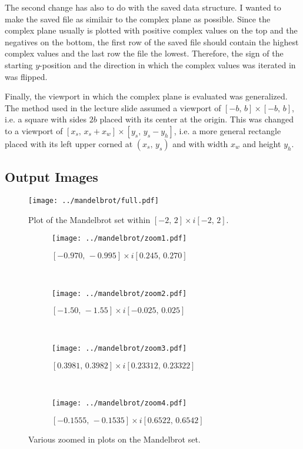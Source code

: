 \documentclass{article}
\begin{document}
The second change has also to do with the saved data structure.
I wanted to make the saved file as similair to the complex plane as possible.
Since the complex plane usually is plotted with positive complex values on the top
and the negatives on the bottom,
the first row of the saved file should contain the highest complex values
and the last row the file the lowest.
Therefore, the sign of the starting $y$-position
and the direction in which the complex values was iterated in was flipped.

Finally, the viewport in which the complex plane is evaluated was generalized.
The method used in the lecture slide assumed a viewport of $[-b,\,b] \times [-b,\,b]$,
i.e. a square with sides $2b$ placed with its center at the origin.
This was changed to a viewport of $[x_s,\,x_s+x_w] \times [y_s,\,y_s-y_h]$,
i.e. a more general rectangle placed with its left upper corned at $(x_s,\,y_s)$
and with width $x_w$ and height $y_h$.

\subsection*{Output Images}

\begin{figure}[!ht]
  \centering
  \texttt{[image: ../mandelbrot/full.pdf]}
  \caption{Plot of the Mandelbrot set within $[-2,\,2] \times i[-2,\,2]$.}
  \label{fig:standardview}
\end{figure}

\begin{figure}[!ht]
  \centering

  \begin{subfigure}[t]{0.45\textwidth}
    \centering
    \texttt{[image: ../mandelbrot/zoom1.pdf]}
    \caption{$[-0.970,\,-0.995] \times i[0.245,\,0.270]$}
  \end{subfigure}
  ~
  \begin{subfigure}[t]{0.45\textwidth}
    \centering
    \texttt{[image: ../mandelbrot/zoom2.pdf]}
    \caption{$[-1.50,\,-1.55] \times i[-0.025,\,0.025]$}
  \end{subfigure}
  ~
  \begin{subfigure}[t]{0.45\textwidth}
    \centering
    \texttt{[image: ../mandelbrot/zoom3.pdf]}
    \caption{$[0.3981,\,0.3982] \times i[0.23312,\,0.23322]$}
  \end{subfigure}
  ~
  \begin{subfigure}[t]{0.45\textwidth}
    \centering
    \texttt{[image: ../mandelbrot/zoom4.pdf]}
    \caption{$[-0.1555,\,-0.1535] \times i[0.6522,\,0.6542]$}
  \end{subfigure}

  \caption{Various zoomed in plots on the Mandelbrot set.}
\end{figure}
\end{document}
